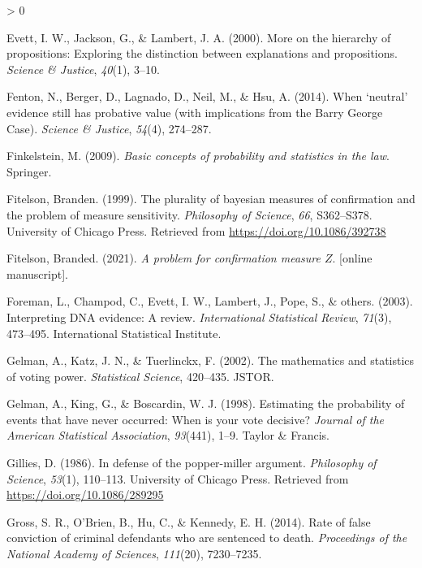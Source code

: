 \documentclass[
  10pt,
  dvipsnames,enabledeprecatedfontcommands]{scrartcl}
\newlength{\cslhangindent}
\newenvironment{CSLReferences}[2] %
 {%
  \setlength{\parindent}{0pt}
  \ifodd #1 \everypar{\setlength{\hangindent}{\cslhangindent}}\ignorespaces\fi
  \ifnum #2 > 0
  \setlength{\parskip}{#2\baselineskip}
  \fi
 }%
 {}
\begin{document}
\begin{CSLReferences}{1}{0}
\leavevmode\hypertarget{ref-evett2000MoreHierarchyPropositions}{}%
Evett, I. W., Jackson, G., \& Lambert, J. A. (2000). More on the
hierarchy of propositions: Exploring the distinction between
explanations and propositions. \emph{Science \& Justice}, \emph{40}(1),
3--10.

\leavevmode\hypertarget{ref-fenton2014WhenNeutralEvidence}{}%
Fenton, N., Berger, D., Lagnado, D., Neil, M., \& Hsu, A. (2014). When
{`neutral'} evidence still has probative value (with implications from
the {Barry George Case}). \emph{Science \& Justice}, \emph{54}(4),
274--287.

\leavevmode\hypertarget{ref-finkelstein2009basic}{}%
Finkelstein, M. (2009). \emph{Basic concepts of probability and
statistics in the law}. Springer.

\leavevmode\hypertarget{ref-Fitelson1999plurality}{}%
Fitelson, Branden. (1999). The plurality of bayesian measures of
confirmation and the problem of measure sensitivity. \emph{Philosophy of
Science}, \emph{66}, S362--S378. University of Chicago Press. Retrieved
from \url{https://doi.org/10.1086/392738}

\leavevmode\hypertarget{ref-Fitelson2021z_measure}{}%
Fitelson, Branded. (2021). \emph{A problem for confirmation measure
\(Z\)}. {[}online manuscript{]}.

\leavevmode\hypertarget{ref-foreman2003interpreting}{}%
Foreman, L., Champod, C., Evett, I. W., Lambert, J., Pope, S., \&
others. (2003). Interpreting DNA evidence: A review. \emph{International
Statistical Review}, \emph{71}(3), 473--495. International Statistical
Institute.

\leavevmode\hypertarget{ref-gelman2002mathematics}{}%
Gelman, A., Katz, J. N., \& Tuerlinckx, F. (2002). The mathematics and
statistics of voting power. \emph{Statistical Science}, 420--435. JSTOR.

\leavevmode\hypertarget{ref-gelman1998estimating}{}%
Gelman, A., King, G., \& Boscardin, W. J. (1998). Estimating the
probability of events that have never occurred: When is your vote
decisive? \emph{Journal of the American Statistical Association},
\emph{93}(441), 1--9. Taylor \& Francis.

\leavevmode\hypertarget{ref-Gillies1986defense}{}%
Gillies, D. (1986). In defense of the popper-miller argument.
\emph{Philosophy of Science}, \emph{53}(1), 110--113. University of
Chicago Press. Retrieved from \url{https://doi.org/10.1086/289295}

\leavevmode\hypertarget{ref-gross2014RateFalseConviction}{}%
Gross, S. R., O'Brien, B., Hu, C., \& Kennedy, E. H. (2014). Rate of
false conviction of criminal defendants who are sentenced to death.
\emph{Proceedings of the National Academy of Sciences}, \emph{111}(20),
7230--7235.


\end{CSLReferences}
\end{document}
